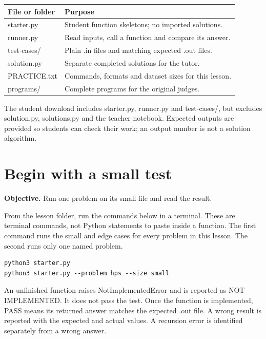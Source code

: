\documentclass[11pt,a4paper,oneside]{report}
\newcommand{\sectiongoal}[1]{\par{\color{quiet}\textbf{Objective.} #1}\par\smallskip}
\newcommand{\nextpointer}[1]{\par\smallskip{\color{quiet}\textbf{Next.} #1}\par}
\begin{document}
\par\medskip\begingroup\small\setlength{\tabcolsep}{4pt}\renewcommand{\arraystretch}{1.3}\begin{tabularx}{\linewidth}{>{\raggedright\arraybackslash}p{30mm}>{\raggedright\arraybackslash}X}\toprule\textbf{File or folder} & \textbf{Purpose}\\\midrule
{}starter.py & Student function skeletons; no imported solutions.\\
{}runner.py & Read inputs, call a function and compare its answer.\\
{}test-cases/ & Plain .in files and matching expected .out files.\\
{}solution.py & Separate completed solutions for the tutor.\\
{}PRACTICE.txt & Commands, formats and dataset sizes for this lesson.\\
{}programs/ & Complete programs for the original judges.\\
\bottomrule\end{tabularx}\endgroup\par\medskip
The student download includes starter.py, runner.py and test-cases/, but excludes solution.py, solutions.py and the teacher notebook. Expected outputs are provided so students can check their work; an output number is not a solution algorithm.

\nextpointer{Run the small tests first.}
\section{Begin with a small test}
\sectiongoal{Run one problem on its small file and read the result.}
From the lesson folder, run the commands below in a terminal. These are terminal commands, not Python statements to paste inside a function. The first command runs the small and edge cases for every problem in this lesson. The second runs only one named problem.

\begin{lstlisting}[language={}]
python3 starter.py
python3 starter.py --problem hps --size small
\end{lstlisting}
An unfinished function raises NotImplementedError and is reported as NOT IMPLEMENTED. It does not pass the test. Once the function is implemented, PASS means its returned answer matches the expected .out file. A wrong result is reported with the expected and actual values. A recursion error is identified separately from a wrong answer.
\end{document}
